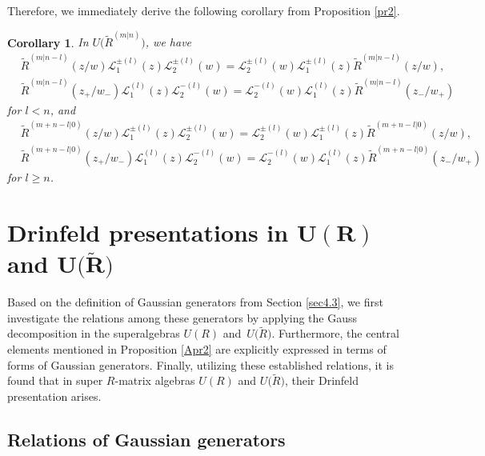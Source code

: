 \documentclass[10pt,a4paper]{amsart}
\numberwithin{equation}{section}
\newtheorem{Corollary}[Theorem]{Corollary}
\begin{document}
Therefore, we immediately derive the following corollary from Proposition \ref{pr2}.
\begin{Corollary}\label{co2}In $U\bigl(\widetilde{R}^{(m|n)}\bigr)$, we have
\begin{align*}
 &\widetilde{R}^{(m|n-l)}(z/w)\mathcal{L}_1^{\pm(l)}(z)\mathcal{L}_2^{\pm(l)}(w)=\mathcal{L}_2^{\pm(l)}(w)\mathcal{L}_1^{\pm(l)}(z) \widetilde{R}^{(m|n-l)}(z/w),\\
&\widetilde{R}^{(m|n-l)}(z_+/w_-)\mathcal{L}_1^{(l)}(z)\mathcal{L}_2^{-(l)}(w)=\mathcal{L}_2^{-(l)}(w)\mathcal{L}_1^{(l)}(z) \widetilde{R}^{(m|n-l)}(z_-/w_+)
\end{align*}for $l< n$, and
\begin{align*}
 &\widetilde{R}^{(m+n-l|0)}(z/w)\mathcal{L}_1^{\pm(l)}(z)\mathcal{L}_2^{\pm(l)}(w)=\mathcal{L}_2^{\pm(l)}(w)\mathcal{L}_1^{\pm(l)}(z) \widetilde{R}^{(m+n-l|0)}(z/w),\\
&\widetilde{R}^{(m+n-l|0)}(z_+/w_-)\mathcal{L}_1^{(l)}(z)\mathcal{L}_2^{-(l)}(w)=\mathcal{L}_2^{-(l)}(w)\mathcal{L}_1^{(l)}(z) \widetilde{R}^{(m+n-l|0)}(z_-/w_+)
\end{align*}for $l\geq n$.
\end{Corollary}

\section[Drinfeld presentations in U(R) and U(R)]{Drinfeld presentations in $\boldsymbol{U(R)}$ and $\boldsymbol{U\bigl(\widetilde{R}\bigr)}$ }\label{sec5}



Based on the definition of Gaussian generators from Section \ref{sec4.3},
 we first investigate the relations among these generators by applying the Gauss decomposition in the superalgebras $U(R)$ and~$U\bigl(\widetilde{R}\bigr)$.
Furthermore, the central elements mentioned in Proposition \ref{Apr2} are explicitly expressed in terms of forms of Gaussian generators. Finally,
utilizing these established relations, it is found that in super $R$-matrix algebras $U(R)$ and $U\bigl(\widetilde{R}\bigr)$, their Drinfeld presentation arises.



\subsection{Relations of Gaussian generators}
\end{document}
